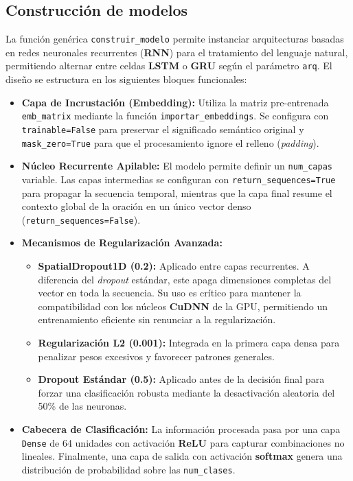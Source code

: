 \documentclass{article}
\begin{document}
\subsection{Construcción de modelos}

La función genérica \texttt{construir\_modelo} permite instanciar arquitecturas basadas en redes neuronales recurrentes (\textbf{RNN}) para el tratamiento del lenguaje natural, permitiendo alternar entre celdas \textbf{LSTM} \cite{hochreiter1997} o \textbf{GRU} \cite{cho2014} según el parámetro \texttt{arq}. El diseño se estructura en los siguientes bloques funcionales:

\begin{itemize}
    \item \textbf{Capa de Incrustación (Embedding):} Utiliza la matriz pre-entrenada \texttt{emb\_matrix} mediante la función \texttt{importar\_embeddings}. Se configura con \texttt{trainable=False} para preservar el significado semántico original y \texttt{mask\_zero=True} para que el procesamiento ignore el relleno (\textit{padding}).
    
    \item \textbf{Núcleo Recurrente Apilable:} El modelo permite definir un \texttt{num\_capas} variable. Las capas intermedias se configuran con \texttt{return\_sequences=True} para propagar la secuencia temporal, mientras que la capa final resume el contexto global de la oración en un único vector denso (\texttt{return\_sequences=False}).
    
    \item \textbf{Mecanismos de Regularización Avanzada:}
    \begin{itemize}
        \item \textbf{SpatialDropout1D (0.2):} Aplicado entre capas recurrentes. A diferencia del \textit{dropout} estándar, este apaga dimensiones completas del vector en toda la secuencia. Su uso es crítico para mantener la compatibilidad con los núcleos \textbf{CuDNN} de la GPU, permitiendo un entrenamiento eficiente sin renunciar a la regularización.
        \item \textbf{Regularización L2 (0.001):} Integrada en la primera capa densa para penalizar pesos excesivos y favorecer patrones generales.
        \item \textbf{Dropout Estándar (0.5):} Aplicado antes de la decisión final para forzar una clasificación robusta mediante la desactivación aleatoria del 50\% de las neuronas.
    \end{itemize}

    \item \textbf{Cabecera de Clasificación:} La información procesada pasa por una capa \texttt{Dense} de 64 unidades con activación \textbf{ReLU} para capturar combinaciones no lineales. Finalmente, una capa de salida con activación \textbf{softmax} genera una distribución de probabilidad sobre las \texttt{num\_clases}.
\end{itemize}
\end{document}
